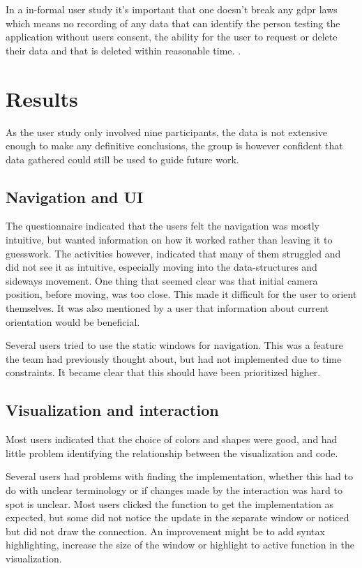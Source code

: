 In a in-formal user study it's important that one doesn't break any \gls{gdpr} laws which means no recording of any data that can identify the person testing the application without users consent, the ability for the user to request or delete their data and that is deleted within reasonable time. \cite{lovdata:gdpr}. 

\section{Results}
As the user study only involved nine participants, the data is not extensive enough to make any definitive conclusions, the group is however confident that data gathered could still be used to guide future work. 

\subsection{Navigation and UI}
The questionnaire indicated that the users felt the navigation was mostly intuitive, but wanted information on how it worked rather than leaving it to guesswork. The activities however, indicated that many of them struggled and did not see it as intuitive, especially moving into the data-structures and sideways movement. One thing that seemed clear was that initial camera position, before moving, was too close. This made it difficult for the user to orient themselves. It was also mentioned by a user that information about current orientation would be beneficial.

Several users tried to use the static windows for navigation. This was a feature the team had previously thought about, but had not implemented due to time constraints. It became clear that this should have been prioritized higher.

\subsection{Visualization and interaction}
Most users indicated that the choice of colors and shapes were good, and had little problem identifying the relationship between the visualization and code. 

Several users had problems with finding the implementation, whether this had to do with unclear terminology or if changes made by the interaction was hard to spot is unclear. Most users clicked the function to get the implementation as expected, but some did not notice the update in the separate window or noticed but did not draw the connection. An improvement might be to add syntax highlighting, increase the size of the window or highlight to active function in the visualization.

